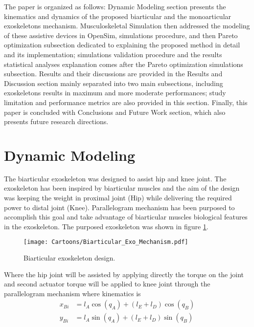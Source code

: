\documentclass[10pt,letterpaper]{article}
\begin{document}
The paper is organized as follows: Dynamic Modeling section presents the kinematics and dynamics of the proposed biarticular and the monoarticular exoskeletons mechanism. Musculoskeletal Simulation then addressed the modeling of these assistive devices in OpenSim, simulations procedure, and then Pareto optimization subsection dedicated to explaining the proposed method in detail and its implementation; simulations validation procedure and the results statistical analyses explanation comes after the Pareto optimization simulations subsection. Results and their discussions are provided in the Results and Discussion section mainly separated into two main subsections, including exoskeletons results in maximum and more moderate performances; study limitation and performance metrics are also provided in this section. Finally, this paper is concluded with Conclusions and Future Work section, which also presents future research directions.
\section*{Dynamic Modeling}

The biarticular exoskeleton was designed to assist hip and knee joint. The exoskeleton has been inspired by biarticular muscles and the aim of the design was keeping the weight in proximal joint (Hip) while delivering the required power to distal joint (Knee). Parallelogram mechanism has been purposed to accomplish this goal and take advantage of biarticular muscles biological features in the exoskeleton.  The purposed exoskeleton was shown in figure \ref{Fig_Biarticular_Exo_Mechanism}.
\begin{figure}[h!]
	\centering
	\texttt{[image: Cartoons/Biarticular\_Exo\_Mechanism.pdf]}
	\caption{Biarticular exoskeleton design.}
	\label{Fig_Biarticular_Exo_Mechanism}
\end{figure}

Where the hip joint will be assisted by applying directly the torque on the joint and second actuator torque will be applied to knee joint through the parallelogram mechanism where kinematics is 
\begin{align}\label{Eqn_Bi_Kin}
x_{Bi} &= l_ {A}\cos (q_ {A}) + (l_ {E} + l_ {D})\cos (q_ {B})\\
y_{Bi} &= l_ {A}\sin (q_ {A}) + (l_ {E} + l_ {D})\sin (q_ {B})
\end{align}
\end{document}
